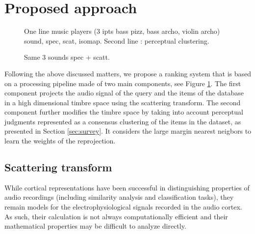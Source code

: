 \documentclass{bmcart}
\begin{document}


\section*{Proposed approach}
\label{sec:method}

\begin{figure}[h!]
\caption{
One line music players (3 ipts bass pizz, bass archo, violin archo) sound, spec,
scat, isomap.
Second line : perceptual clustering.}
\label{fig:pipeline}
\end{figure}

\begin{figure}[h!]
\caption{
Same 3 sounds spec + scatt.}
\end{figure}

Following the above discussed matters, we propose a ranking system that is based on a processing pipeline made of two main components, see Figure \ref{fig:pipeline}. The first component projects the audio signal of the query and the items of the database in a high dimensional timbre space using the scattering transform. The second component further modifies the timbre space by taking into account perceptual judgments represented as a consensus clustering of the items in the dataset, as presented in Section \ref{sec:survey}. It considers the large margin nearest neigbors to learn the weights of the reprojection.



\subsection*{Scattering transform}
\label{sec:scattering}


While cortical representations have been successful in distinguishing properties of audio recordings (including similarity analysis and classification tasks), they remain models for the electrophysiological signals recorded in the audio cortex.
As such, their calculation is not always computationally efficient and their mathematical properties may be difficult to analyze directly.
\end{document}
